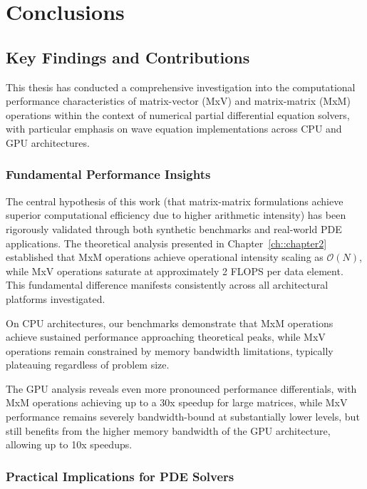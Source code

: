 
\chapter{Conclusions}

\label{ch::chapter9}

\vspace{-1cm}

\section{Key Findings and Contributions}

This thesis has conducted a comprehensive investigation into the computational performance characteristics of matrix-vector (MxV) and matrix-matrix (MxM) operations within the context of numerical partial differential equation solvers, with particular emphasis on wave equation implementations across CPU and GPU architectures.

\subsection*{Fundamental Performance Insights}

The central hypothesis of this work (that matrix-matrix formulations achieve superior computational efficiency due to higher arithmetic intensity) has been rigorously validated through both synthetic benchmarks and real-world PDE applications. The theoretical analysis presented in Chapter~\ref{ch::chapter2} established that MxM operations achieve operational intensity scaling as $\mathcal{O}(N)$, while MxV operations saturate at approximately 2 FLOPS per data element. This fundamental difference manifests consistently across all architectural platforms investigated.

On CPU architectures, our benchmarks demonstrate that MxM operations achieve sustained performance approaching theoretical peaks, while MxV operations remain constrained by memory bandwidth limitations, typically plateauing regardless of problem size.

The GPU analysis reveals even more pronounced performance differentials, with MxM operations achieving up to a 30x speedup for large matrices, while MxV performance remains severely bandwidth-bound at substantially lower levels, but still benefits from the higher memory bandwidth of the GPU architecture, allowing up to 10x speedups.

\subsection*{Practical Implications for PDE Solvers}

